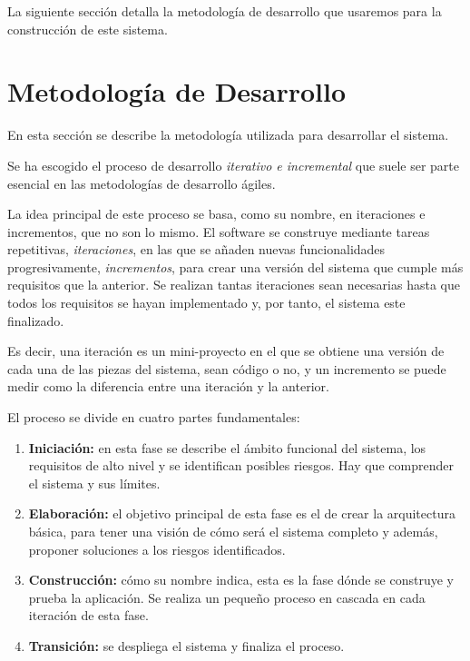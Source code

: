 
La siguiente sección detalla la metodología de desarrollo que usaremos para la construcción de este sistema.

\section{Metodología de Desarrollo}
\label{sec:planificacion:metodologia}


En esta sección se describe la metodología utilizada para desarrollar el sistema.
\newline

Se ha escogido el proceso de desarrollo \emph{iterativo e incremental} que suele ser parte esencial en las metodologías de desarrollo ágiles.
\newline

La idea principal de este proceso se basa, como su nombre, en iteraciones e incrementos, que no son lo mismo.
El software se construye mediante tareas repetitivas, \emph{iteraciones}, en las que se añaden nuevas funcionalidades progresivamente, \emph{incrementos}, para crear una versión del sistema que cumple más requisitos que la anterior. Se realizan tantas iteraciones sean necesarias hasta que todos los requisitos se hayan implementado y, por tanto, el sistema este finalizado.

Es decir, una iteración es un mini-proyecto en el que se obtiene una versión de cada una de las piezas del sistema, sean código o no, y un incremento se puede medir como la diferencia entre una iteración y la anterior.
\newline

El proceso se divide en cuatro partes fundamentales:

\begin{enumerate}

    \item \textbf{Iniciación:} en esta fase se describe el ámbito funcional del sistema, los requisitos de alto nivel y se identifican posibles riesgos. Hay que comprender el sistema y sus límites.

    \item \textbf{Elaboración:} el objetivo principal de esta fase es el de crear la arquitectura básica, para tener una visión de cómo será el sistema completo y además, proponer soluciones a los riesgos identificados.

    \item \textbf{Construcción:} cómo su nombre indica, esta es la fase dónde se construye y prueba la aplicación. Se realiza un pequeño proceso en cascada en cada iteración de esta fase.

    \item \textbf{Transición:} se despliega el sistema y finaliza el proceso.

\end{enumerate}


